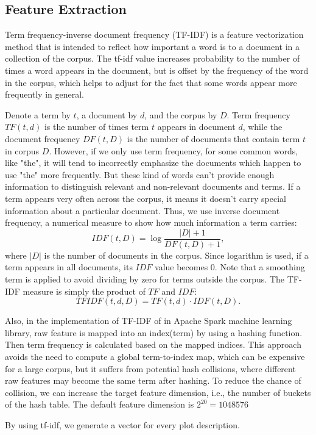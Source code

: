 \documentclass{vldb}
\begin{document}
\subsection{Feature Extraction}
Term frequency-inverse document frequency (TF-IDF) is a feature vectorization method that is intended to reflect how important a word is to a document in a collection of the corpus. The tf-idf value increases probability to the number of times a word appears in the document, but is offset by the frequency of the word in the corpus, which helps to adjust for the fact that some words appear more frequently in general.
\par Denote a term by $t$, a document by $d$, and the corpus by $D$. Term frequency $TF(t,d)$ is the number of times term $t$ appears in document $d$, while the document frequency $DF(t,D)$ is the number of documents that contain term $t$ in corpus $D$. However, if we only use term frequency, for some common words, like "the", it will tend to incorrectly emphasize the documents which happen to use "the" more frequently. But these kind of words can't provide enough information to distinguish relevant and non-relevant documents and terms. If a term appears very often across the corpus, it means it doesn’t carry special information about a particular document. Thus, we use inverse document frequency, a numerical measure to show how much information a term carries:
\begin{displaymath}
IDF(t,D) = \log\frac{|D|+1}{DF(t,D)+1},
\end{displaymath}
where $|D|$ is the number of documents in the corpus. Since logarithm is used, if a term appears in all documents, its $IDF$ value becomes 0. Note that a smoothing term is applied to avoid dividing by zero for terms outside the corpus. The TF-IDF measure is simply the product of $TF$ and $IDF$:
\begin{displaymath}
TFIDF(t,d,D)=TF(t,d)⋅IDF(t,D).
\end{displaymath} 
\par Also, in the implementation of TF-IDF of in  Apache Spark machine learning library, raw feature is mapped into an index(term) by using a hashing function. Then term frequency is calculated based on the mapped indices. This approach avoids the need to compute a global term-to-index map, which can be expensive for a large corpus, but it suffers from potential hash collisions, where different raw features may become the same term after hashing. To reduce the chance of collision, we can increase the target feature dimension, i.e., the number of buckets of the hash table. The default feature dimension is $2^{20}=1048576$
\par By using tf-idf, we generate a vector for every plot description.
\end{document}
